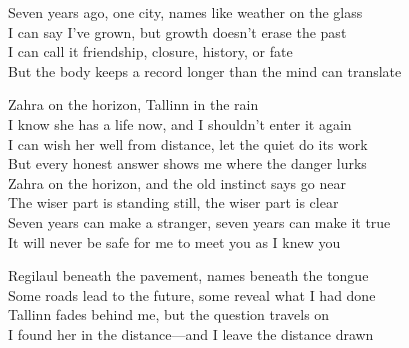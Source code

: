 \begin{lyrics}
Seven years ago, one city, names like weather on the glass\\
I can say I've grown, but growth doesn't erase the past\\
I can call it friendship, closure, history, or fate\\
But the body keeps a record longer than the mind can translate

Zahra on the horizon, Tallinn in the rain\\
I know she has a life now, and I shouldn't enter it again\\
I can wish her well from distance, let the quiet do its work\\
But every honest answer shows me where the danger lurks\\
Zahra on the horizon, and the old instinct says go near\\
The wiser part is standing still, the wiser part is clear\\
Seven years can make a stranger, seven years can make it true\\
It will never be safe for me to meet you as I knew you

Regilaul beneath the pavement, names beneath the tongue\\
Some roads lead to the future, some reveal what I had done\\
Tallinn fades behind me, but the question travels on\\
I found her in the distance—and I leave the distance drawn
\end{lyrics}

